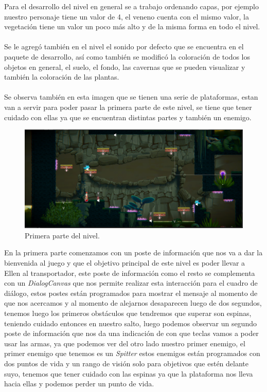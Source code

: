 \documentclass[a4paper,12pt]{article}
\begin{document}
    Para el desarrollo del nivel en general se a trabajo ordenando capas, por ejemplo nuestro personaje tiene un valor de 4, el veneno cuenta con el mismo valor, la vegetación tiene un valor un poco más alto y de la misma forma en todo el nivel.
    \\
    \\
    Se le agregó también en el nivel el sonido por defecto que se encuentra en el paquete de desarrollo, así como también se modificó la coloración de todos los objetos en general, el suelo, el fondo, las cavernas que se pueden visualizar y también la coloración de las plantas.
    \\
    \\
    Se observa también en esta imagen que se tienen una serie de plataformas, estan van a servir para poder pasar la primera parte de este nivel, se tiene que tener cuidado con ellas ya que se encuentran distintas partes y también un enemigo.
\clearpage
\newpage

    \begin{figure}[ht]
        \centering                \includegraphics[width=1\textwidth]{images/CaptureIDSE02.PNG}
        \caption{Primera parte del nivel.}
    \end{figure}    
    
    En la primera parte comenzamos con un poste de información que nos va a dar la bienvenida al juego y que el objetivo principal de este nivel es poder llevar a Ellen al transportador, este poste de información como el resto se complementa con un \textit{DialogCanvas} que nos permite realizar esta interacción para el cuadro de diálogo, estos postes están programados para mostrar el mensaje al momento de que nos acercamos y al momento de alejarnos desaparecen luego de dos segundos, tenemos luego los primeros obstáculos que tendremos que superar son espinas, teniendo cuidado entonces en nuestro salto, luego podemos observar un segundo poste de información que nos da una indicación de con que teclas vamos a poder usar las armas, ya que podemos ver del otro lado nuestro primer enemigo, el primer enemigo que tenemos es un \textit{Spitter} estos enemigos están programados con dos puntos de vida y un rango de visión solo para objetivos que estén delante suyo, tenemos que tener cuidado con las espinas ya que la plataforma nos lleva hacia ellas y podemos perder un punto de vida.
\end{document}
